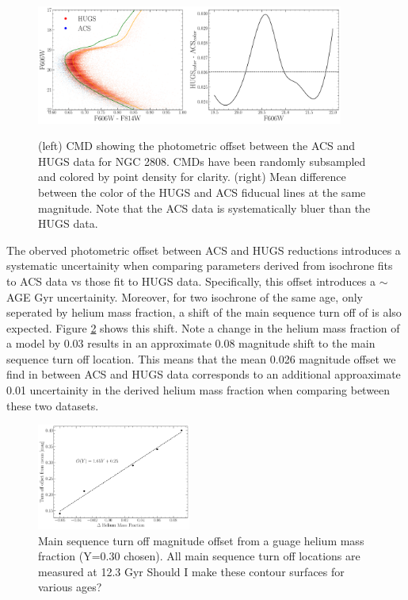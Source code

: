\begin{figure}
  \centering
  \includegraphics[width=0.90\textwidth]{src/figures/photometricOffset.pdf}
  \label{fig:offset}
  \caption{(left) CMD showing the photometric offset between the ACS and HUGS data for NGC 2808. CMDs have been randomly subsampled and colored by point density for clarity. (right) Mean difference between the color of the HUGS and ACS fiducual lines at the same magnitude. Note that the ACS data is systematically bluer than the HUGS data.}
\end{figure}

The oberved photometric offset between ACS and HUGS reductions introduces a
systematic uncertainity when comparing parameters derived from isochrone fits
to ACS data vs those fit to HUGS data. Specifically, this offset introduces a
{\color{red}$\sim$AGE Gyr} uncertainity. Moreover, for two isochrone of the
same age, only seperated by helium mass fraction, a shift of the main sequence
turn off of is also expected. Figure \ref{fig:HeMO} shows this shift. Note a change in the helium mass fraction of a model by 0.03 results in an approximate 0.08 magnitude shift to the main sequence turn off location. This means that the mean 0.026 magnitude offset we find in between ACS and HUGS data corresponds to an additional approaximate 0.01 uncertainity in the derived helium mass fraction when comparing between these two datasets. 

\begin{figure}
  \centering
  \includegraphics[width=0.45\textwidth]{src/figures/HeliumMeanOffset.pdf}
  \caption{Main sequence turn off magnitude offset from a guage helium mass fraction (Y=0.30 chosen). All main sequence turn off locations are measured at 12.3 Gyr {\color{blue} Should I make these contour surfaces for various ages?}}
  \label{fig:HeMO}
\end{figure}
